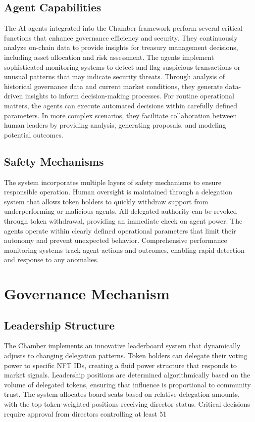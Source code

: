 \documentclass[12pt]{article}
\begin{document}
\subsection{Agent Capabilities}
The AI agents integrated into the Chamber framework perform several critical functions that enhance governance efficiency and security. They continuously analyze on-chain data to provide insights for treasury management decisions, including asset allocation and risk assessment. The agents implement sophisticated monitoring systems to detect and flag suspicious transactions or unusual patterns that may indicate security threats. Through analysis of historical governance data and current market conditions, they generate data-driven insights to inform decision-making processes. For routine operational matters, the agents can execute automated decisions within carefully defined parameters. In more complex scenarios, they facilitate collaboration between human leaders by providing analysis, generating proposals, and modeling potential outcomes.

\subsection{Safety Mechanisms}
The system incorporates multiple layers of safety mechanisms to ensure responsible operation. Human oversight is maintained through a delegation system that allows token holders to quickly withdraw support from underperforming or malicious agents. All delegated authority can be revoked through token withdrawal, providing an immediate check on agent power. The agents operate within clearly defined operational parameters that limit their autonomy and prevent unexpected behavior. Comprehensive performance monitoring systems track agent actions and outcomes, enabling rapid detection and response to any anomalies.

\section{Governance Mechanism}

\subsection{Leadership Structure}
The Chamber implements an innovative leaderboard system that dynamically adjusts to changing delegation patterns. Token holders can delegate their voting power to specific NFT IDs, creating a fluid power structure that responds to market signals. Leadership positions are determined algorithmically based on the volume of delegated tokens, ensuring that influence is proportional to community trust. The system allocates board seats based on relative delegation amounts, with the top token-weighted positions receiving director status. Critical decisions require approval from directors controlling at least 51%
\end{document}
